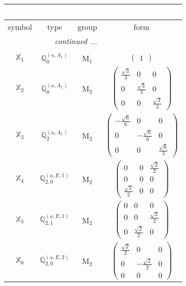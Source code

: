 \documentclass[fleqn,10pt,landscape]{article}
\begin{document}
\begin{itemize}
\begin{center}
\begin{longtable}{c|c|c|c}
\multicolumn{3}{l}{\tablename\ \thetable{}} \\
 \hline \hline
symbol & type & group & form \\ \hline \endhead

 \hline \hline
\multicolumn{3}{r}{\footnotesize\it continued ...} \\ \endfoot

 \hline \hline
\multicolumn{3}{r}{} \\ \endlastfoot

$ \mathbb{X}_{1} $ & $\mathbb{Q}_{0}^{(a,A_{1})}$ & M$_{1}$ & $\begin{pmatrix} 1 \end{pmatrix}$ \\ \hline
$ \mathbb{X}_{2} $ & $\mathbb{Q}_{0}^{(a,A_{1})}$ & M$_{2}$ & $\begin{pmatrix} \frac{\sqrt{3}}{3} & 0 & 0 \\ 0 & \frac{\sqrt{3}}{3} & 0 \\ 0 & 0 & \frac{\sqrt{3}}{3} \end{pmatrix}$ \\
$ \mathbb{X}_{3} $ & $\mathbb{Q}_{2}^{(a,A_{1})}$ & M$_{2}$ & $\begin{pmatrix} - \frac{\sqrt{6}}{6} & 0 & 0 \\ 0 & - \frac{\sqrt{6}}{6} & 0 \\ 0 & 0 & \frac{\sqrt{6}}{3} \end{pmatrix}$ \\
$ \mathbb{X}_{4} $ & $\mathbb{Q}_{2,0}^{(a,E,1)}$ & M$_{2}$ & $\begin{pmatrix} 0 & 0 & \frac{\sqrt{2}}{2} \\ 0 & 0 & 0 \\ \frac{\sqrt{2}}{2} & 0 & 0 \end{pmatrix}$ \\
$ \mathbb{X}_{5} $ & $\mathbb{Q}_{2,1}^{(a,E,1)}$ & M$_{2}$ & $\begin{pmatrix} 0 & 0 & 0 \\ 0 & 0 & \frac{\sqrt{2}}{2} \\ 0 & \frac{\sqrt{2}}{2} & 0 \end{pmatrix}$ \\
$ \mathbb{X}_{6} $ & $\mathbb{Q}_{2,0}^{(a,E,2)}$ & M$_{2}$ & $\begin{pmatrix} \frac{\sqrt{2}}{2} & 0 & 0 \\ 0 & - \frac{\sqrt{2}}{2} & 0 \\ 0 & 0 & 0 \end{pmatrix}$ \\

\end{longtable}
\end{center}
\end{itemize}
\end{document}
